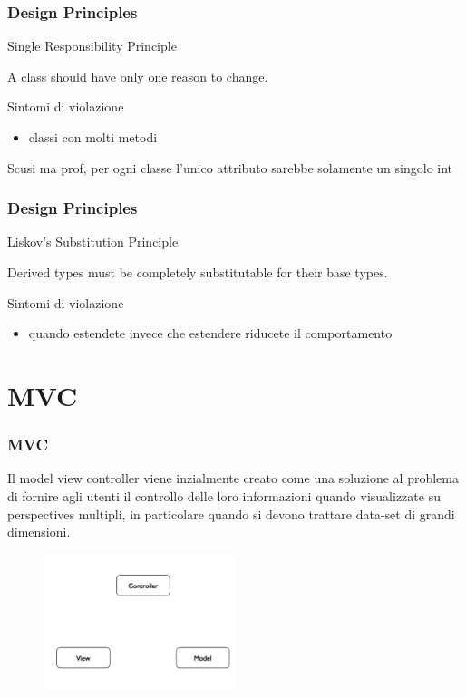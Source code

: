 \documentclass{beamer}
\begin{document}
\begin{frame}
\frametitle{Design Principles}
Single Responsibility Principle
\begin{framed}
A class should have only one reason to change.
\end{framed}
Sintomi di violazione 
\begin{itemize}
\item classi con molti metodi
\end{itemize}

Scusi ma prof, per ogni classe l'unico attributo sarebbe solamente un singolo int

\end{frame}

\begin{frame}
\frametitle{Design Principles}
Liskov's Substitution Principle
\begin{framed}
Derived types must be completely substitutable for their base types.
\end{framed}

Sintomi di violazione 
\begin{itemize}
\item quando estendete invece che estendere riducete il comportamento
\end{itemize}
\end{frame}





\section{MVC}
\begin{frame}
\frametitle{MVC}
Il model view controller viene inzialmente creato come una soluzione al problema di fornire agli utenti il controllo delle loro informazioni quando visualizzate su perspectives multipli, in particolare quando si devono trattare data-set di grandi dimensioni.
\begin{figure}
\centering
\includegraphics[width=0.5\textwidth]{Img/MVC1.pdf}
\end{figure}
\end{frame}
\end{document}
